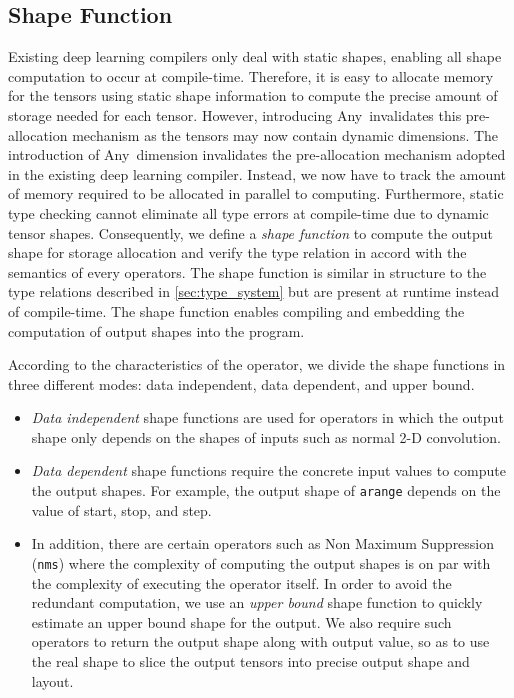 \subsection{Shape Function}
\label{sec:type_systemTech:shape-func}
Existing deep learning compilers only deal with static shapes,
  enabling all shape computation to occur at compile-time.
Therefore, it is easy to allocate memory for the tensors
  using static shape information to compute the precise amount of storage needed for each tensor.
However, introducing Any~invalidates this pre-allocation
  mechanism as the tensors may now contain dynamic dimensions.
The introduction of Any~dimension invalidates the pre-allocation
  mechanism adopted in the existing deep learning compiler.
Instead, we now have to track the amount of memory required to be allocated in parallel to computing.
Furthermore, static type checking cannot eliminate all
  type errors at compile-time due to dynamic tensor shapes.
Consequently, we define a {\em shape function} to compute the output shape
  for storage allocation and verify the type relation in accord with the semantics of every operators.
The shape function is similar in structure to the type relations described in
  \ref{sec:type_system} but are present at runtime instead of compile-time.
The shape function enables compiling and embedding the computation of output shapes into the program.

According to the characteristics of the operator, we divide the shape functions
  in three different modes: data independent, data dependent, and upper bound.
\begin{itemize}
  \item {\em Data independent} shape functions are used for operators in which the output shape
        only depends on the shapes of inputs such as normal 2-D convolution.
  \item {\em Data dependent} shape functions require the concrete input values to compute the output shapes.
        For example, the output shape of \texttt{arange} depends on the value of start, stop, and step.
  \item In addition, there are certain operators such as Non Maximum Suppression (\texttt{nms}) where the
        complexity of computing the output shapes is on par with the complexity of executing the operator itself.
  In order to avoid the redundant computation, we use an {\em upper bound} shape function to quickly estimate an upper bound shape for the output.
  We also require such operators to return the output shape along with output value, so as to use the real shape to slice the output tensors into precise output shape and layout.
\end{itemize}

